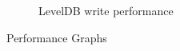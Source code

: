 \begin{figure}
\begin{subfigure}{.5\textwidth}
  \vspace{-0.05in}
  \caption{LevelDB write performance}
  \vspace{0.1in}
  \label{fig:sub8}
\end{subfigure}
  \caption{Performance Graphs}
  \label{graphs}
\end{figure}

